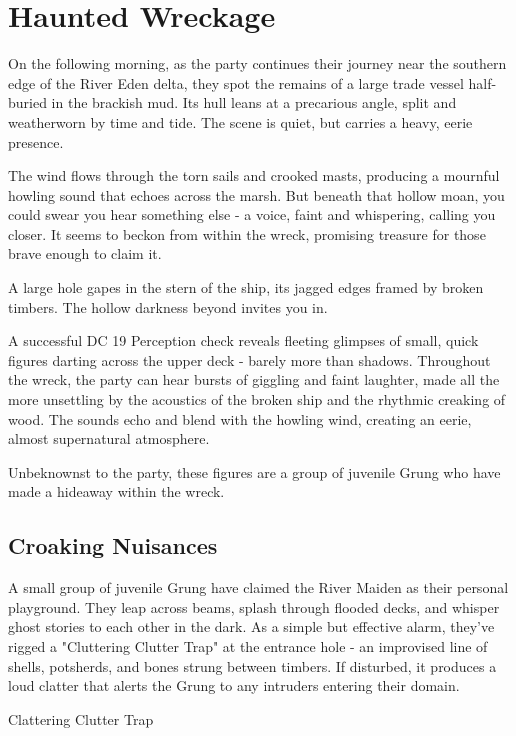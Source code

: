 \section*{Haunted Wreckage}
{\entryfont On the following morning, as the party continues their journey near the southern edge of the River Eden delta, they spot the remains of a large trade vessel half-buried in the brackish mud. Its hull leans at a precarious angle, split and weatherworn by time and tide. The scene is quiet, but carries a heavy, eerie presence.}

\begin{DndReadAloud}
	The wind flows through the torn sails and crooked masts, producing a mournful howling sound that echoes across the marsh. But beneath that hollow moan, you could swear you hear something else - a voice, faint and whispering, calling you closer. It seems to beckon from within the wreck, promising treasure for those brave enough to claim it.

	A large hole gapes in the stern of the ship, its jagged edges framed by broken timbers. The hollow darkness beyond invites you in.
\end{DndReadAloud}

{\entryfont\noindent A successful DC 19 Perception check reveals fleeting glimpses of small, quick figures darting across the upper deck - barely more than shadows. Throughout the wreck, the party can hear bursts of giggling and faint laughter, made all the more unsettling by the acoustics of the broken ship and the rhythmic creaking of wood. The sounds echo and blend with the howling wind, creating an eerie, almost supernatural atmosphere.

Unbeknownst to the party, these figures are a group of juvenile Grung who have made a hideaway within the wreck.}

\subsection*{Croaking Nuisances}
{\entryfont A small group of juvenile Grung have claimed the River Maiden as their personal playground. They leap across beams, splash through flooded decks, and whisper ghost stories to each other in the dark. As a simple but effective alarm, they've rigged a "Cluttering Clutter Trap" at the entrance hole - an improvised line of shells, potsherds, and bones strung between timbers. If disturbed, it produces a loud clatter that alerts the Grung to any intruders entering their domain.}
\begin{DndTrap}[width=0.5\textwidth - 4pt]{Clattering Clutter Trap}
\end{DndTrap}

